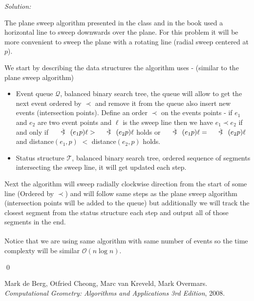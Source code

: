 \documentclass[a4paper, 8pt, oneside]{article}
\newcommand{\arcangle}{\mathord{\mathpalette\doarcangle\relax}}
\newcommand{\doarcangle}[2]{%
  \hbox{%
    \sbox0{$#1B$}%
    \sbox2{$#1<$}%
    \raisebox{\dimexpr\dp2+(\ht0-\ht2)/2}{%
      $#1<\mspace{-9mu}\mathrel{)}\mspace{2mu}$%
    }%
  }%
}
\newenvironment{sol}
    {\emph{Solution:}
    }
    {
    \qed
    }
\begin{document}
\begin{enumerate}
\begin{sol}
The plane sweep algorithm  presented in the class and in the book \cite[Chapter 2]{computationalbook} used a horizontal line to sweep downwards over the plane. For this problem it will be more convenient to sweep the plane with a rotating line (radial sweep centered at $p$).

We start by describing the data structures the algorithm uses - (similar to the plane sweep algorithm)
 \begin{itemize}
   \item Event queue $\mathcal{Q}$, balanced binary search tree, 
   the queue will allow to get the next event ordered by $\prec$ and remove it from the queue also insert new events (intersection points).
   Define an order $\prec$ on the events points - if $e_1$ and $e_2$ are two event points and $\ell$ is the sweep line then we have $e_1 \prec e_2$ if and only if $\arcangle (e_1 p) \ell > \arcangle (e_2 p) \ell$ holds or $\arcangle (e_1 p) \ell = \arcangle (e_2 p) \ell$ and distance$(e_1, p)$ $<$ distance$(e_2, p)$ holds.
  \item Status structure $\mathcal{T}$, balanced binary search tree, ordered sequence of segments intersecting the sweep line, it will get updated each step.
\end{itemize}
Next the algorithm will sweep radially clockwise direction from the start of some line (Ordered by $\prec$) and will follow same steps as the plane sweep algorithm (intersection points will be added to the queue) but additionally we will track the closest segment from the status structure each step and output all of those segments in the end.
\\ \\
Notice that we are using same algorithm with same number of events so the time complexty will be similar $\mathcal{O}(n\log{}n)$.
\end{sol}

\end{enumerate}


\medskip
 
\begin{thebibliography}{9}
Mark de Berg, Otfried Cheong, Marc van Kreveld, Mark Overmars.
\textit{Computational Geometry: Algorithms and Applications 3rd Edition}, 2008.
\end{thebibliography}
\end{document}
